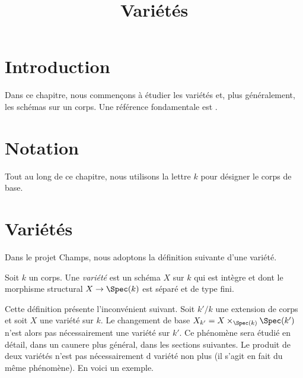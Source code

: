 

%


\title{Variétés}


\maketitle

\label{section-phantom}

\tableofcontents

\section{Introduction}
\label{section-introduction}

\noindent
Dans ce chapitre, nous commençons à étudier les variétés et, plus
généralement, les schémas sur un corps. Une référence fondamentale est \cite{EGA}.








\section{Notation}
\label{section-notation}

\noindent
Tout au long de ce chapitre, nous utilisons la lettre $k$ pour désigner le corps de base.










\section{Variétés}
\label{section-varieties}

\noindent
Dans le projet Champs, nous adoptons la définition suivante
d'une variété.

\begin{definition}
\label{definition-variety}
Soit $k$ un corps. Une {\it variété} est un schéma $X$ sur $k$
qui est intègre et dont le morphisme structural
$X \to \Spec(k)$ est séparé et de type fini.
\end{definition}

\noindent
Cette définition présente l'inconvénient suivant. Soit $k'/k$
une extension de corps et soit $X$ une variété sur $k$. Le changement
de base $X_{k'} = X \times_{\Spec(k)} \Spec(k')$ n'est alors
pas nécessairement une variété sur $k'$. Ce phénomène sera étudié
en détail, dans un caunere plus général, dans les sections suivantes.
Le produit de deux variétés n'est pas nécessairement d variété non
plus (il s'agit en fait du même phénomène).
En voici un exemple.


